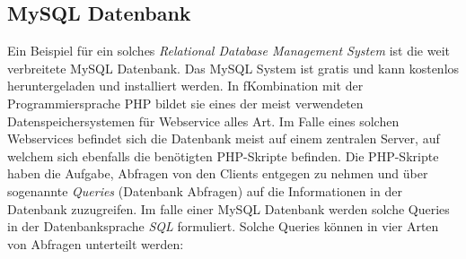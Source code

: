 \documentclass[a4paper,11pt]{report}
\begin{document}
				\subsection{MySQL Datenbank}
				Ein Beispiel für ein solches \emph{Relational Database Management System} ist die weit verbreitete MySQL Datenbank. Das MySQL System ist gratis und kann kostenlos heruntergeladen und installiert werden. In fKombination mit der Programmiersprache PHP bildet sie eines der meist verwendeten Datenspeichersystemen für Webservice alles Art. Im Falle eines solchen Webservices befindet sich die Datenbank meist auf einem zentralen Server, auf welchem sich ebenfalls die benötigten PHP-Skripte befinden. Die PHP-Skripte haben die Aufgabe, Abfragen von den Clients entgegen zu nehmen und über sogenannte \emph{Queries} (Datenbank Abfragen) auf die Informationen in der Datenbank zuzugreifen. Im falle einer MySQL Datenbank werden solche Queries in der Datenbanksprache \emph{SQL} formuliert. Solche Queries können in vier Arten von Abfragen unterteilt werden: \cite{IT-Handbuch}
				
\end{document}

